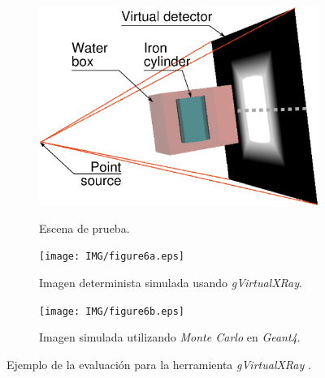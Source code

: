 \begin{figure}[h]
    \begin{subfigure}[b]{0.25\linewidth}
        \centering
        {\includegraphics[width=0.8\linewidth]{IMG/figure3a.eps}}
        \caption{\label{subfig:polychromatismA} Escena de prueba.}
    \end{subfigure}
    \null\hfill
     \begin{subfigure}[b]{0.25\linewidth}
        \centering
        {\texttt{[image: IMG/figure6a.eps]}}
        \caption{\label{subfig:GPU} Imagen determinista simulada  usando \emph{gVirtualXRay}.}
    \end{subfigure}
    \null\hfill
    \begin{subfigure}[b]{0.25\linewidth}
        \centering
        {\texttt{[image: IMG/figure6b.eps]}}
        \caption{\label{subfig:Gate} Imagen simulada utilizando \emph{Monte Carlo} en \emph{Geant4}.}
    \end{subfigure}

\caption{\label{fig:validation} Ejemplo de la evaluación para la herramienta \emph{gVirtualXRay} \cite{sujar:hal}.}
\end{figure}











